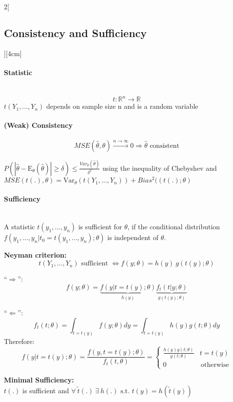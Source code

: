 \documentclass[8pt]{extarticle}
\begin{document}
\begin{multicols}{2}[\subsection{Consistency and Sufficiency}][4cm]

\paragraph{Statistic} \ \\
$$t: \mathbb{R}^n \rightarrow \mathbb{R}$$
$t(Y_1, ..., Y_n)$ depends on sample size n and is a random variable

\paragraph{(Weak) Consistency}
$$MSE(\hat{\theta},\theta) \overset{n\rightarrow\infty}{\longrightarrow} 0 \Rightarrow \hat{\theta} \text{ consistent}$$

\begin{Proof}
$P(|\hat{\theta} - \mathrm{E}_{\theta}(\hat{\theta})| \geq \delta) \leq \frac{Var_\theta(\hat{\theta})}{\delta^2}$ using the inequality of Chebyshev
and $MSE(t(.), \theta) = \mathrm{Var}_\theta(t(Y_1,...,Y_n)) + Bias^2((t(.); \theta)$
\end{Proof}

\paragraph{Sufficiency} \ \\
\noindent A statistic $t(y_1,...,y_n)$ is sufficient for $\theta$, if the conditional distribution $f(y_1,...,y_n|t_0 = t(y_1,...,y_n);\theta)$ is independent of $\theta$. \vspace{0.5em}

\textbf{Neyman criterion:}
$$t(Y_1,...,Y_n) \text{ sufficient } \Leftrightarrow f(y;\theta) = h(y)\:g(t(y);\theta)$$
\begin{Proof}
``$\Rightarrow$'':
$$f(y;\theta) = \underbrace{f(y|t {=} t(y);\theta)}_{h(y)} \underbrace{f_t(t|y;\theta)}_{g(t(y);\theta)}$$

\noindent ``$\Leftarrow$'':
$$f_t(t;\theta) = \int_{t=t(y)} f(y;\theta)dy = \int_{t=t(y)} h(y) g(t;\theta)dy$$
\indent Therefore:
$$f\left(y|t{=}t(y);\theta\right) = \frac{f(y,t{=}t(y);\theta)}{f_t(t,\theta)}
= \begin{cases}
\frac{h(y)g(t;\theta)}{g(t;\theta)} & t=t(y) \\
0 & \, \text{otherwise}
\end{cases}$$
\end{Proof}

\textbf{Minimal Sufficiency:} \ \\
$t(.)$ is sufficient and $\forall\: \tilde{t}(.)\: \exists\: h(.) \text{ s.t. } t(y) = h(\tilde{t}(y))$



\end{multicols}
\end{document}
